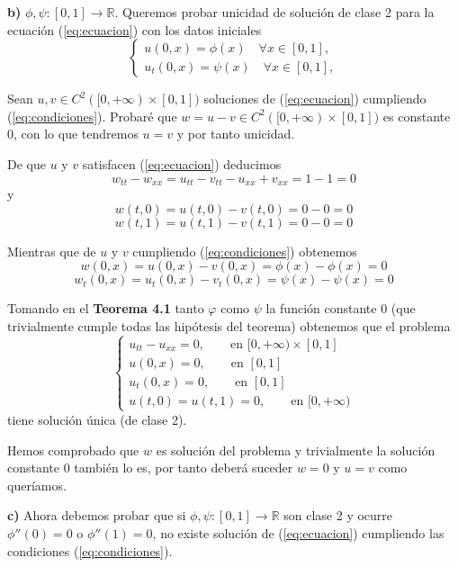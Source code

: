\documentclass[a4]{article}
\begin{document}
\vspace{4mm}

\textbf{b)} $\phi,\psi:[0,1]\rightarrow\mathbb{R}$. Queremos probar
unicidad de solución de clase 2 para la ecuación (\ref{eq:ecuacion})
con los datos iniciales
\begin{equation} \label{eq:condiciones}
  \begin{cases}
    u(0,x)=\phi(x)\quad\forall x\in [0,1], \\
    u_t(0,x)=\psi(x)\quad\forall x\in [0,1],
  \end{cases}
\end{equation}

Sean $u,v\in C^2([0,+\infty)\times[0,1])$ soluciones de
(\ref{eq:ecuacion}) cumpliendo (\ref{eq:condiciones}). Probaré que
$w=u-v\in C^2([0,+\infty)\times[0,1])$ es constante 0, con lo que
tendremos $u=v$ y por tanto unicidad.

De que $u$ y $v$ satisfacen (\ref{eq:ecuacion}) deducimos
\[w_{tt}-w_{xx}=u_{tt}-v_{tt}-u_{xx}+v_{xx}=1-1=0\]
y
\[w(t,0)=u(t,0)-v(t,0)=0-0=0\]
\[w(t,1)=u(t,1)-v(t,1)=0-0=0\]

Mientras que de $u$ y $v$ cumpliendo (\ref{eq:condiciones}) obtenemos
\[w(0,x)=u(0,x)-v(0,x)=\phi(x)-\phi(x)=0\]
\[w_t(0,x)=u_t(0,x)-v_t(0,x)=\psi(x)-\psi(x)=0\]

Tomando en el \textbf{Teorema 4.1} tanto $\varphi$ como $\psi$ la
función constante 0 (que trivialmente cumple todas las hipótesis del
teorema) obtenemos que el problema
\begin{equation} \label{eq:problema0}
  \begin{cases}
    u_{tt}-u_{xx}=0, \qquad\mbox{en } [0,+\infty)\times [0,1] \\
    u(0,x)=0, \qquad\mbox{en } [0,1] \\
    u_t(0,x)=0, \qquad\mbox{en } [0,1] \\
    u(t,0)=u(t,1)=0, \qquad\mbox{en } [0,+\infty)
  \end{cases}
\end{equation}
tiene solución única (de clase 2).

Hemos comprobado que $w$ es solución del problema y trivialmente la
solución constante 0 también lo es, por tanto deberá suceder $w=0$ y
$u=v$ como queríamos.

\vspace{4mm}

\textbf{c)} Ahora debemos probar que si
$\phi,\psi:[0,1]\rightarrow\mathbb{R}$ son clase 2 y ocurre
$\phi''(0)=0$ o $\phi''(1)=0$, no existe solución de
(\ref{eq:ecuacion}) cumpliendo las condiciones (\ref{eq:condiciones}).
\end{document}
